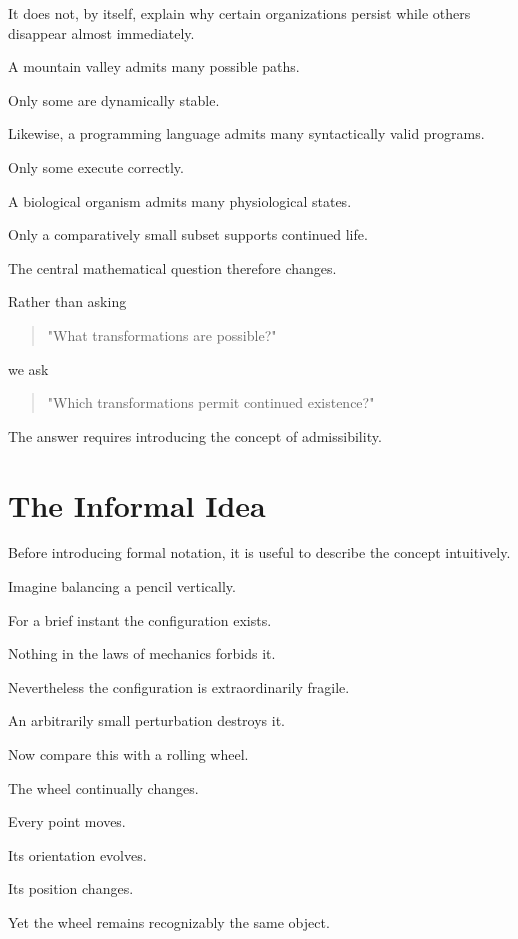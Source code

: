 \documentclass[11pt,oneside]{book}
\numberwithin{equation}{chapter}
\theoremstyle{definition}
\theoremstyle{plain}
\begin{document}
It does not, by itself, explain why certain organizations persist while
others disappear almost immediately.

A mountain valley admits many possible paths.

Only some are dynamically stable.

Likewise, a programming language admits many syntactically valid programs.

Only some execute correctly.

A biological organism admits many physiological states.

Only a comparatively small subset supports continued life.

The central mathematical question therefore changes.

Rather than asking

\begin{quote}
"What transformations are possible?"
\end{quote}

we ask

\begin{quote}
"Which transformations permit continued existence?"
\end{quote}

The answer requires introducing the concept of admissibility.

\section{The Informal Idea}

Before introducing formal notation, it is useful to describe the concept
intuitively.

Imagine balancing a pencil vertically.

For a brief instant the configuration exists.

Nothing in the laws of mechanics forbids it.

Nevertheless the configuration is extraordinarily fragile.

An arbitrarily small perturbation destroys it.

Now compare this with a rolling wheel.

The wheel continually changes.

Every point moves.

Its orientation evolves.

Its position changes.

Yet the wheel remains recognizably the same object.
\end{document}
